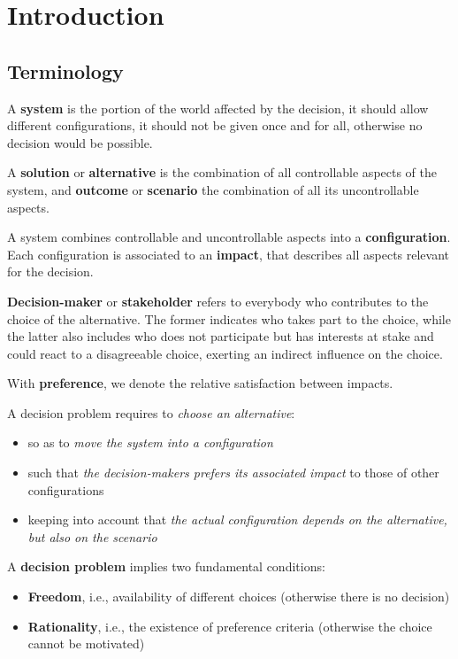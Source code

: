 \chapter{Introduction}

\section{Terminology}

A \textbf{system} is the portion of the world affected by the decision, it should allow different configurations, it should not be given once and for all, otherwise no decision would be possible. 

A \textbf{solution} or \textbf{alternative} is the combination of all controllable aspects of the system, and \textbf{outcome} or \textbf{scenario} the combination of all its uncontrollable aspects. 

A system combines controllable and uncontrollable aspects into a \textbf{configuration}. Each configuration is associated to an \textbf{impact}, that describes all aspects relevant for the decision.

\textbf{Decision-maker} or \textbf{stakeholder} refers to everybody who contributes to the choice of the alternative. The former indicates who takes part to the choice, while the latter also includes who does not participate but has interests at stake and could react to a disagreeable choice, exerting an indirect influence on the choice. 

With \textbf{preference}, we denote the relative satisfaction between impacts. 

A decision problem requires to \textit{choose an alternative}: 
\begin{itemize}
	\item so as to \textit{move the system into a configuration} 
	
	\item such that \textit{the decision-makers prefers its associated impact} to those of other configurations
	
	\item keeping into account that \textit{the actual configuration depends on the alternative, but also on the scenario}
\end{itemize}

A \textbf{decision problem} implies two fundamental conditions: 
\begin{itemize}
	\item \textbf{Freedom}, i.e., availability of different choices (otherwise there is no decision)
	
	\item \textbf{Rationality}, i.e., the existence of preference criteria (otherwise the choice cannot be motivated)
\end{itemize}

